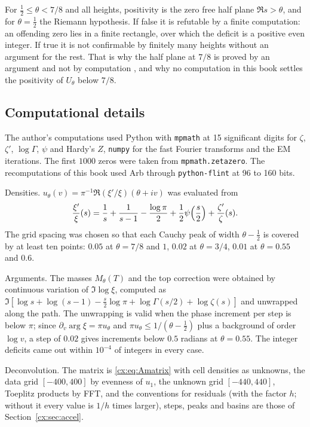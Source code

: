 For $\tfrac12\le\theta<7/8$ and all heights, positivity is the zero free half plane $\Re s>\theta$, and for $\theta=\tfrac12$ the Riemann hypothesis. If false it is refutable by a finite computation: an offending zero lies in a finite rectangle, over which the deficit is a positive even integer. If true it is not confirmable by finitely many heights without an argument for the rest. That is why the half plane at $7/8$ is proved by an argument and not by computation \cite{OAI26a}, and why no computation in this book settles the positivity of $U_\theta$ below $7/8$.

\subsection{Computational details}\label{cx:sec:details}

The author's computations used Python with \texttt{mpmath} \cite{mpmath} at 15 significant digits for $\zeta$, $\zeta'$, $\log\Gamma$, $\psi$ and Hardy's $Z$, \texttt{numpy} for the fast Fourier transforms and the EM iterations. The first $1000$ zeros were taken from \texttt{mpmath.zetazero}. The recomputations of this book used Arb through \texttt{python-flint} \cite{Arb,pythonflint} at 96 to 160 bits.

Densities. $u_\theta(v)=\pi^{-1}\Re(\xi'/\xi)(\theta+iv)$ was evaluated from
\[
\frac{\xi'}{\xi}(s)=\frac1s+\frac1{s-1}-\frac{\log\pi}2+\frac12\psi\Bigl(\frac s2\Bigr)+\frac{\zeta'}{\zeta}(s).
\]
The grid spacing was chosen so that each Cauchy peak of width $\theta-\tfrac12$ is covered by at least ten points: $0.05$ at $\theta=7/8$ and $1$, $0.02$ at $\theta=3/4$, $0.01$ at $\theta=0.55$ and $0.6$.

Arguments. The masses $M_\theta(T)$ and the top correction were obtained by continuous variation of $\Im\log\xi$, computed as $\Im[\log s+\log(s-1)-\tfrac s2\log\pi+\log\Gamma(s/2)+\log\zeta(s)]$ and unwrapped along the path. The unwrapping is valid when the phase increment per step is below $\pi$; since $\partial_v\arg\xi=\pi u_\theta$ and $\pi u_\theta\le1/(\theta-\tfrac12)$ plus a background of order $\log v$, a step of $0.02$ gives increments below $0.5$ radians at $\theta=0.55$. The integer deficits came out within $10^{-4}$ of integers in every case.

Deconvolution. The matrix is \eqref{cx:eq:Amatrix} with cell densities as unknowns, the data grid $[-400,400]$ by evenness of $u_1$, the unknown grid $[-440,440]$, Toeplitz products by FFT, and the conventions for residuals (with the factor $h$; without it every value is $1/h$ times larger), steps, peaks and basins are those of Section~\ref{cx:sec:accel}.

